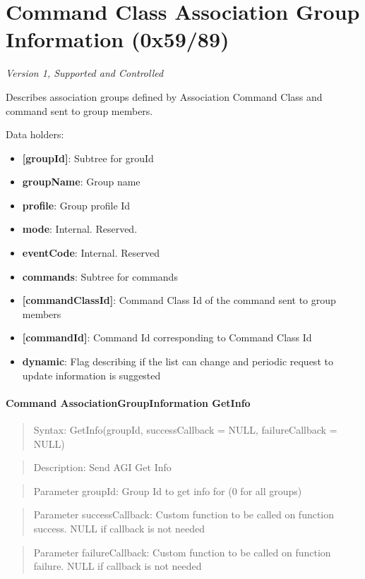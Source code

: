 \section{Command Class Association Group Information (0x59/89)}

\textit{Version 1, Supported and Controlled}
\newline

Describes association groups defined by Association Command Class and command sent to group members.
\newline

\noindent
Data holders:

\begin{itemize}
\item \textbf{[groupId]}: Subtree for grouId
\item \qquad\textbf{groupName}: Group name
\item \qquad\textbf{profile}: Group profile Id
\item \qquad\textbf{mode}: Internal. Reserved.
\item \qquad\textbf{eventCode}: Internal. Reserved
\item \qquad\textbf{commands}: Subtree for commands
\item \qquad\qquad\textbf{[commandClassId]}: Command Class Id of the command sent to group members
\item \qquad\qquad\qquad\textbf{[commandId]}: Command Id corresponding to Command Class Id
\item \textbf{dynamic}: Flag describing if the list can change and periodic request to update information is suggested
\end{itemize}

\paragraph{Command AssociationGroupInformation GetInfo}
\begin{quote}Syntax: GetInfo(groupId, successCallback = NULL, failureCallback = NULL)\end{quote}
\begin{quote}Description: Send AGI Get Info\end{quote}
\begin{quote}Parameter groupId: Group Id to get info for (0 for all groups)\end{quote}
\begin{quote}Parameter successCallback: Custom function to be called on function success. NULL if callback is not needed\end{quote}
\begin{quote}Parameter failureCallback: Custom function to be called on function failure. NULL if callback is not needed\end{quote}


